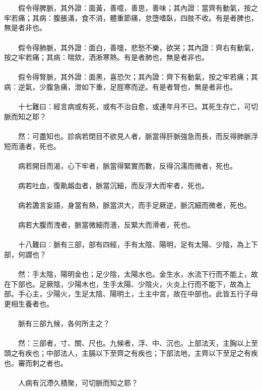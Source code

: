 \\\\
　　假令得脾脈，其外證：面黃，善噫，善思，善味；其內證：當齊有動氣，按之牢若痛；其病：腹脹滿，食不消，體重節痛，怠墮嗜臥，四肢不收。有是者脾也，無是者非也。
\\\\
　　假令得肺脈，其外證：面白，善嚏，悲愁不樂，欲哭；其內證：齊右有動氣，按之牢若痛；其病：喘欬，洒淅寒熱。有是者肺也，無是者非也。
\\\\
　　假令得腎脈，其外證：面黑，喜恐欠；其內證：齊下有動氣，按之牢若痛；其病：逆氣，少腹急痛，泄如下重，足脛寒而逆。有是者腎也，無是者非也。
\\\\
　　十七難曰：經言病或有死，或有不治自愈，或連年月不已。其死生存亡，可切脈而知之耶？
\\\\
　　然：可盡知也。診病若閉目不欲見人者，脈當得肝脈強急而長，而反得肺脈浮短而濇者，死也。
\\\\
　　病若開目而渴，心下牢者，脈當得緊實而數，反得沉濡而微者，死也。
\\\\
　　病若吐血，復鼽衂血者，脈當沉細，而反浮大而牢者，死也。
\\\\
　　病若譫言妄語，身當有熱，脈當洪大，而手足厥逆，脈沉細而微者，死也。
\\\\
　　病若大腹而洩者，脈當微細而濇，反緊大而滑者，死也。
\\\\
　　十八難曰：脈有三部，部有四經，手有太陰、陽明，足有太陽、少陰，為上下部，何謂也？
\\\\
　　然：手太陰，陽明金也；足少陰，太陽水也。金生水，水流下行而不能上，故在下部也。足厥陰，少陽木也，生手太陽、少陰火，火炎上行而不能下，故為上部。手心主，少陽火，生足太陰、陽明土，土主中宮，故在中部也。此皆五行子母更相生養者也。
\\\\
　　脈有三部九候，各何所主之？
\\\\
　　然：三部者，寸、關、尺也。九候者，浮、中、沉也。上部法天，主胸以上至頭之有疾也；中部法人，主膈以下至齊之有疾也；下部法地，主齊以下至足之有疾也。審而刺之者也。
\\\\
　　人病有沉滯久積聚，可切脈而知之耶？
\\\\
